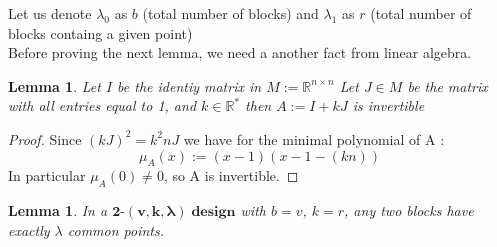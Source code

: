 \documentclass{article}
\newtheorem{lemma}[theorem]{Lemma}
\numberwithin{equation}{theorem}
\numberwithin{figure}{theorem}
\newcommand{\tParamDesign}[4]{\ensuremath{\bm{#1\mbox{-}(#2,#3,#4)\; design}}}
\newcommand{\myMatrixRing}[2]{\ensuremath{#1^{#2\times#2}}}
\begin{document}
Let us denote $\lambda_0$ as $b$ (total number of blocks) and
$\lambda_1$ as $r$ (total number of blocks containg a given point)\\
Before proving the next lemma, we need a another fact from linear algebra.
\begin{lemma}\label{invertible}
Let $I$ be the identiy matrix in {$M := \myMatrixRing{\mathbb{R}}{n}$} Let $J \in M$ be the matrix with all entries equal to 1, and $k \in \mathbb{R}^*$ then $A := I + kJ$ is invertible
\end{lemma}
\begin{proof}
Since $(kJ)^2 = k^2 n J$ we have for the minimal polynomial of A :
\[
	\mu_A(x) := (x - 1)(x - 1 - (kn))
\]
In particular $\mu_A(0) \neq 0$, so A is invertible.
\end{proof}
\begin{lemma}\label{lambdaCommonPoints}
In a {\tParamDesign{2}{v}{k}{\lambda}} with $b = v$, $k = r$, any two blocks have exactly $\lambda$ common points.
\end{lemma}
\end{document}
